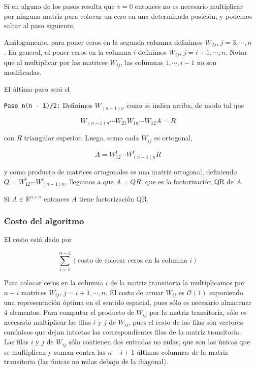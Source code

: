 Si en alguno de los pasos resulta que $v = 0$ entonces no es necesario multiplicar por ninguna matriz para colocar un cero en una determinada posición, y podemos saltar al paso siguiente.

Análogamente, para poner ceros en la segunda columna definimos $W_{2j}$, $j = 3, \cdots, n$. En general, al poner ceros en la columna $i$ definimos $W_{ij}$, $j = i + 1, \cdots, n$. Notar que al multiplicar por las matrices $W_{ij}$, las columnas $1, \cdots, i - 1$ no son modificadas.

El último paso será el

\texttt{Paso n(n - 1)/2:} Definimos $W_{(n - 1)n}$ como se indica arriba, de modo tal que

\[W_{(n-1)n} \cdots W_{23}W_{1n} \cdots W_{12} A = R\]

con $R$ triangular superior. Luego, como cada $W_{ij}$ es ortogonal,

\[A = W_{12}^t \cdots W_{(n-1)n}^tR\]

y como producto de matrices ortogonales es una matriz ortogonal, definiendo $Q = W_{12}^t \cdots W_{(n-1)n}^t$, llegamos a que $A = QR$, que es la factorización QR de $A$.

\begin{propo}
Si $A \in \mathbb{R}^{n \times n}$ entonces $A$ tiene factorización QR.
\end{propo}

\subsubsection{Costo del algoritmo}

El costo está dado por

\[\sum_{i = 1}^{n - 1}(\text{costo de colocar ceros en la columna }i)\]

Para colocar ceros en la columna $i$ de la matriz transitoria la multiplicamos por $n - i$ matrices $W_{ij}$, $j = i + 1, \cdots, n$. El costo de armar $W_{ij}$ es $\mathcal{O}(1)$ suponiendo una representación óptima en el sentido espacial, pues sólo es necesario almacenar 4 elementos. Para computar el producto de $W_{ij}$ por la matriz transitoria, sólo es necesario multiplicar las filas $i$ y $j$ de $W_{ij}$, pues el resto de las filas son vectores canónicos que dejan intactas las correspondientes filas de la matriz transitoria. Las filas $i$ y $j$ de $W_{ij}$ sólo contienen dos entradas no nulas, que son las únicas que se multiplican y suman contra las $n - i + 1$ últimas columnas de la matriz transitoria (las únicas no nulas debajo de la diagonal).

